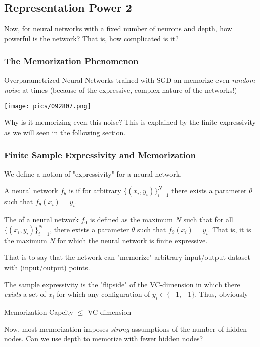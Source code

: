 \documentclass[11pt]{scrartcl}
\begin{document}
\subsection{Representation Power 2}
Now, for neural networks with a fixed number of neurons and depth, how powerful is the network? That is, how complicated is it? 

\subsubsection{The Memorization Phenomenon}
Overparametrized Neural Networks trained with SGD an memorize even \textit{random noise} at times (because of the expressive, complex nature of the networks!) 
\begin{center}
    \texttt{[image: pics/092807.png]}
\end{center}
Why is it memorizing even this noise? This is explained by the finite expressivity as we will seen in the following section.

\subsubsection{Finite Sample Expressivity and Memorization}
We define a notion of "expressivity" for a neural network. 
\begin{defn}
A neural network $f_\theta$ is  if for arbitrary $\{(x_i,y_i)\}_{i=1}^{N}$ there exists a parameter $\theta$ such that $f_\theta(x_i)=y_i$. 
\end{defn}
\begin{defn}
The  of a neural network $f_0$ is defined as the maximum $N$ such that for all $\{(x_i,y_i)\}_{i=1}^{N}$, there exists a parameter $\theta$ such that $f_\theta(x_i)=y_i$. That is, it is the maximum $N$ for which the neural network is finite expressive. 
\end{defn}
That is to say that the network can "memorize" arbitrary input/output dataset with (input/output) points. 

The sample expressivity is the "flipside" of the VC-dimension in which there \textit{exists} a set of $x_i$ for which any configuration of $y_i \in \{-1,+1\}$. Thus, obviously 
\begin{center}
    Memorization Capcity $\le$ VC dimension
\end{center}
Now, most memorization imposes \textit{strong} assumptions of the number of hidden nodes. Can we use depth to memorize with fewer hidden nodes? 
\end{document}
